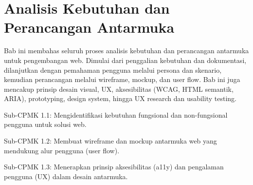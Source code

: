 \documentclass[../main.tex]{subfiles}
\begin{document}
\chapter{Analisis Kebutuhan dan Perancangan Antarmuka}

Bab ini membahas seluruh proses analisis kebutuhan dan perancangan antarmuka untuk pengembangan web. Dimulai dari penggalian kebutuhan dan dokumentasi, dilanjutkan dengan pemahaman pengguna melalui persona dan skenario, kemudian perancangan melalui wireframe, mockup, dan user flow. Bab ini juga mencakup prinsip desain visual, UX, aksesibilitas (WCAG, HTML semantik, ARIA), prototyping, design system, hingga UX research dan usability testing.

\begin{subcpmk}
  \item Sub-CPMK 1.1: Mengidentifikasi kebutuhan fungsional dan non-fungsional pengguna untuk solusi web.
  \item Sub-CPMK 1.2: Membuat wireframe dan mockup antarmuka web yang mendukung alur pengguna (user flow).
  \item Sub-CPMK 1.3: Menerapkan prinsip aksesibilitas (a11y) dan pengalaman pengguna (UX) dalam desain antarmuka.
\end{subcpmk}













\end{document}

